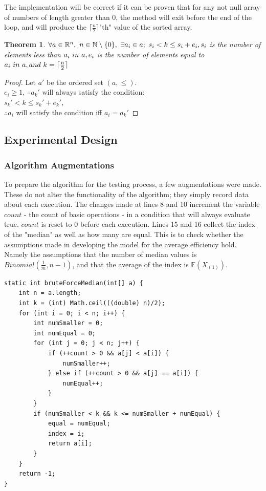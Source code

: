 \documentclass{article}
\newtheorem*{theorem}{Theorem}
\begin{document}
The implementation will be correct if it can be proven that for any not null array of numbers of length greater than 0, the method will exit before the end of the loop, and will produce the $\lceil \frac{n}{2} \rceil$"th" value of the sorted array.

\begin{theorem}
$\forall a \in \mathbb{R}^n,\ n \in \mathbb{N}\setminus\{0\},
\ \exists a_i \in a;\ s_i < k \leq s_i + e_i,\\
s_i$ is the number of elements less than $a_i\ in\ a,\\ 
e_i$ is the number of elements equal to $a_i\ in\ a,\\ 
and\ k = \lceil \frac{n}{2} \rceil$
\end{theorem}

\begin{proof}
Let $a'$ be the ordered set $(a, \leq )$. \\
$e_i \geq 1$, $\therefore a_k'$ will always satisfy the condition:\\
$s_k' < k \leq s_k' + e_k',$\\
$\therefore a_i$ will satisfy the condition iff $a_i = a_k'$
\end{proof}



\pagebreak

\subsection{Experimental Design}
\subsubsection{Algorithm Augmentations}
To prepare the algorithm for the testing process, a few augmentations were made. These do not alter the functionality of the algorithm; they simply record data about each execution. The changes made at lines 8 and 10 increment the variable $count$ - the count of basic operations - in a condition that will always evaluate true. $count$ is reset to 0 before each execution. Lines 15 and 16 collect the index of the "median" as well as how many are equal. This is to check whether the assumptions made in developing the model for the average efficiency hold. Namely the assumptions that the number of median values is $Binomial(\frac{1}{m}, n-1)$, and that the average of the index is $\mathbb{E}(X_{(1)})$.

\begin{lstlisting}
static int bruteForceMedian(int[] a) {
	int n = a.length;
	int k = (int) Math.ceil(((double) n)/2);
	for (int i = 0; i < n; i++) {
		int numSmaller = 0;
		int numEqual = 0;
		for (int j = 0; j < n; j++) {
			if (++count > 0 && a[j] < a[i]) {
				numSmaller++;
			} else if (++count > 0 && a[j] == a[i]) {
				numEqual++;
			}
		}
		if (numSmaller < k && k <= numSmaller + numEqual) {
			equal = numEqual;
			index = i;
			return a[i];
		}
	}
	return -1;
}
\end{lstlisting}
\end{document}
